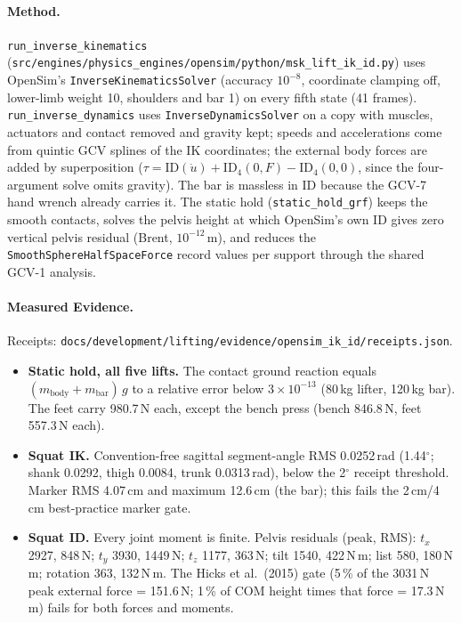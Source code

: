 \documentclass[11pt,a4paper]{article}
\begin{document}
\paragraph{Method.} \texttt{run\_inverse\_kinematics}
(\texttt{src/engines/physics\_engines/opensim/python/msk\_lift\_ik\_id.py}) uses
OpenSim's \texttt{InverseKinematicsSolver} (accuracy $10^{-8}$, coordinate
clamping off, lower-limb weight 10, shoulders and bar 1) on every fifth state
(41 frames). \texttt{run\_inverse\_dynamics} uses \texttt{InverseDynamicsSolver}
on a copy with muscles, actuators and contact removed and gravity kept; speeds
and accelerations come from quintic GCV splines of the IK coordinates; the
external body forces are added by superposition
($\tau = \mathrm{ID}(\dot u) + \mathrm{ID}_4(0, F) - \mathrm{ID}_4(0, 0)$, since
the four-argument solve omits gravity). The bar is massless in ID because the
GCV-7 hand wrench already carries it. The static hold
(\texttt{static\_hold\_grf}) keeps the smooth contacts, solves the pelvis
height at which OpenSim's own ID gives zero vertical pelvis residual (Brent,
$10^{-12}$\,m), and reduces the \texttt{SmoothSphereHalfSpaceForce} record
values per support through the shared GCV-1 analysis.

\paragraph{Measured Evidence.} Receipts:
\texttt{docs/development/lifting/evidence/opensim\_ik\_id/receipts.json}.
\begin{itemize}[nosep]
\item \textbf{Static hold, all five lifts.} The contact ground reaction equals
  $(m_\mathrm{body} + m_\mathrm{bar})\,g$ to a relative error below
  $3\times10^{-13}$ (80\,kg lifter, 120\,kg bar). The feet carry 980.7\,N each,
  except the bench press (bench 846.8\,N, feet 557.3\,N each).
\item \textbf{Squat IK.} Convention-free sagittal segment-angle RMS
  0.0252\,rad (1.44$^\circ$; shank 0.0292, thigh 0.0084, trunk 0.0313\,rad),
  below the 2$^\circ$ receipt threshold. Marker RMS 4.07\,cm and maximum
  12.6\,cm (the bar); this fails the 2\,cm/4\,cm best-practice marker gate.
\item \textbf{Squat ID.} Every joint moment is finite. Pelvis residuals (peak,
  RMS): $t_x$ 2927, 848\,N; $t_y$ 3930, 1449\,N; $t_z$ 1177, 363\,N; tilt 1540,
  422\,N\,m; list 580, 180\,N\,m; rotation 363, 132\,N\,m. The Hicks et
  al.\ (2015) gate (5\,\% of the 3031\,N peak external force = 151.6\,N;
  1\,\% of COM height times that force = 17.3\,N\,m) fails for both forces and
  moments.
\end{itemize}
\end{document}
